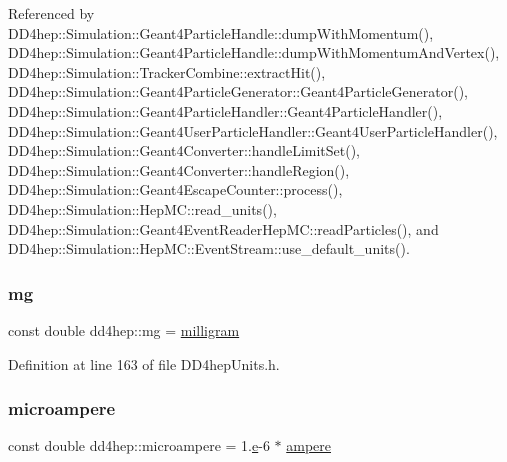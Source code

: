 Referenced by D\+D4hep\+::\+Simulation\+::\+Geant4\+Particle\+Handle\+::dump\+With\+Momentum(), D\+D4hep\+::\+Simulation\+::\+Geant4\+Particle\+Handle\+::dump\+With\+Momentum\+And\+Vertex(), D\+D4hep\+::\+Simulation\+::\+Tracker\+Combine\+::extract\+Hit(), D\+D4hep\+::\+Simulation\+::\+Geant4\+Particle\+Generator\+::\+Geant4\+Particle\+Generator(), D\+D4hep\+::\+Simulation\+::\+Geant4\+Particle\+Handler\+::\+Geant4\+Particle\+Handler(), D\+D4hep\+::\+Simulation\+::\+Geant4\+User\+Particle\+Handler\+::\+Geant4\+User\+Particle\+Handler(), D\+D4hep\+::\+Simulation\+::\+Geant4\+Converter\+::handle\+Limit\+Set(), D\+D4hep\+::\+Simulation\+::\+Geant4\+Converter\+::handle\+Region(), D\+D4hep\+::\+Simulation\+::\+Geant4\+Escape\+Counter\+::process(), D\+D4hep\+::\+Simulation\+::\+Hep\+M\+C\+::read\+\_\+units(), D\+D4hep\+::\+Simulation\+::\+Geant4\+Event\+Reader\+Hep\+M\+C\+::read\+Particles(), and D\+D4hep\+::\+Simulation\+::\+Hep\+M\+C\+::\+Event\+Stream\+::use\+\_\+default\+\_\+units().

\hypertarget{namespacedd4hep_a16e0deb2b676a8d02ab7cf5cf7a8237b}{}\label{namespacedd4hep_a16e0deb2b676a8d02ab7cf5cf7a8237b} 
\subsubsection{\texorpdfstring{mg}{mg}}
{\footnotesize\ttfamily const double dd4hep\+::mg = \hyperlink{namespacedd4hep_ad2ffff3db78948c1ad083f3f41b26acb}{milligram}\hspace{0.3cm}{\ttfamily [static]}}



Definition at line 163 of file D\+D4hep\+Units.\+h.

\hypertarget{namespacedd4hep_a1f84b64efe21c2df40a7816c4918e803}{}\label{namespacedd4hep_a1f84b64efe21c2df40a7816c4918e803} 
\subsubsection{\texorpdfstring{microampere}{microampere}}
{\footnotesize\ttfamily const double dd4hep\+::microampere = 1.\hyperlink{_volumes_8cpp_a8a9a1f93e9b09afccaec215310e64142}{e}-\/6 $\ast$ \hyperlink{namespacedd4hep_a1342ab2280c2fed87fe4beaebae8cf52}{ampere}\hspace{0.3cm}{\ttfamily [static]}}



